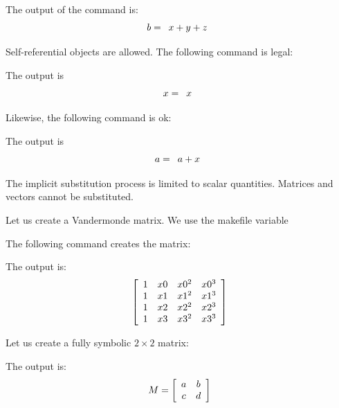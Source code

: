 
The output of the command is:
$$
b = 
\begin{array}{*{1}c}
x + y + z\\
\end{array}
$$

Self-referential objects are allowed. 
The following command is legal:


The output is
$$
x = 
\begin{array}{*{1}c}
x\\
\end{array}
$$

\bigskip

Likewise, the following command is ok:


The output is
$$
a = 
\begin{array}{*{1}c}
a + x\\
\end{array}
$$

\bigskip

The implicit substitution process is limited to scalar quantities. 
Matrices and vectors cannot be substituted.




\bigskip



Let us create a Vandermonde matrix. We use the makefile variable 


The following command creates the matrix:


The output is:
$$
\left[
\begin{array}{*{4}c}
1  & x0  & x0^{2}  & x0^{3}\\
1  & x1  & x1^{2}  & x1^{3}\\
1  & x2  & x2^{2}  & x2^{3}\\
1  & x3  & x3^{2}  & x3^{3}\\
\end{array}
\right]
$$

\bigskip

Let us create a fully symbolic $2 \times 2$ matrix:


The output is:
$$
M = 
\left[
\begin{array}{*{2}c}
a  & b\\
c  & d\\
\end{array}
\right]
$$

